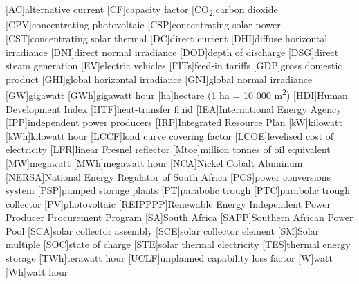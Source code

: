 {}
\chapter*{\listacroname}
\begin{acronym}[XXXXX]
  	[AC]{alternative current}
  	[CF]{capacity factor}
  	[CO\textsubscript{2}]{carbon dioxide}
    [CPV]{concentrating photovoltaic}
    [CSP]{concentrating solar power}
    [CST]{concentrating solar thermal} 
    [DC]{direct current}
    [DHI]{diffuse horizontal irradiance}
    [DNI]{direct normal irradiance}
	[DOD]{depth of discharge}
    [DSG]{direct steam generation}
    [EV]{electric vehicles}
    [FITs]{feed-in tariffs} 
    [GDP]{gross domestic product}
    [GHI]{global horizontal irradiance}
    [GNI]{global normal irradiance}
    [GW]{gigawatt}
    [GWh]{gigawatt hour} 
    [ha]{hectare (1 ha = 10 000 m\textsuperscript{2})} 
    [HDI]{Human Development Index}
    [HTF]{heat-transfer fluid} 
    [IEA]{International Energy Agency}
    [IPP]{independent power producers}
    [IRP]{Integrated Resource Plan}
    [kW]{kilowatt}
    [kWh]{kilowatt hour}
    [LCCF]{load curve covering factor}
    [LCOE]{levelised cost of electricity}
    [LFR]{linear Fresnel reflector}
    [Mtoe]{million tonnes of oil equivalent}
    [MW]{megawatt}
    [MWh]{megawatt hour}
    [NCA]{Nickel Cobalt Aluminum}
    [NERSA]{National Energy Regulator of South Africa}
    [PCS]{power conversions system}
    [PSP]{pumped storage plants}
    [PT]{parabolic trough}
    [PTC]{parabolic trough collector}
    [PV]{photovoltaic}
    [REIPPPP]{Renewable Energy Independent Power Producer Procurement Program}
    [SA]{South Africa}
    [SAPP]{Southern African Power Pool}
    [SCA]{solar collector assembly}
    [SCE]{solar collector element}
    [SM]{Solar multiple}
    [SOC]{state of charge}
    [STE]{solar thermal electricity}
    [TES]{thermal energy storage}
    [TWh]{terawatt hour}
    [UCLF]{unplanned capability loss factor}
    [W]{watt}
    [Wh]{watt hour}
\end{acronym}
